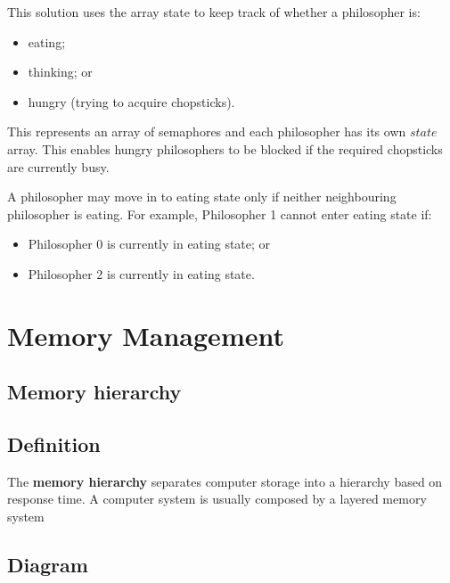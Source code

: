 \documentclass[a4paper]{systems-software}
\begin{document}
This solution uses the array state to keep track of whether a philosopher is:
\begin{itemize}
	\item eating;
	\item thinking; or
	\item hungry (trying to acquire chopsticks).
\end{itemize}

This represents an array of semaphores and each philosopher has its own $state$ array. This enables hungry philosophers to be blocked if the required chopsticks are currently busy.

A philosopher may move in to eating state only if neither neighbouring philosopher is eating. For example, Philosopher 1 cannot enter eating state if:
\begin{itemize}
	\item Philosopher 0 is currently in eating state; or
	\item Philosopher 2 is currently in eating state.
\end{itemize}


\chapter{Memory Management}

\section{Memory hierarchy}

\section*{Definition}

The \textbf{memory hierarchy} separates computer storage into a hierarchy based on response time. A computer system is usually composed by a layered memory system


\section*{Diagram}
\end{document}

